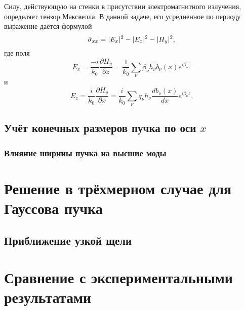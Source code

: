 Силу, действующую на стенки в присутствии электромагнитного излучения, определяет тензор Максвелла. В данной задаче, его усредненное по
периоду выражение даётся формулой
\begin{equation}
\bar{\sigma}_{xx} = \lvert E_x\rvert^2 - \lvert E_z\rvert^2 - \lvert H_y\rvert^2,
\end{equation}
где поля 
\begin{equation*}
E_x = \frac{-i}{k_0}\frac{\partial H_y}{\partial z} = \frac{1}{k_0}\sum_{\nu}\beta_\nu h_\nu b_\nu(x) e^{i \beta_\nu z}
\end{equation*}
и
\begin{equation*}
E_z = \frac{i}{k_0}\frac{\partial H_y}{\partial x} = \frac{i}{k_0}\sum_{\nu} q_\nu h_\nu  \frac{d b_\nu(x)}{d x} e^{i \beta_\nu z}.
\end{equation*}

\section{Учёт конечных размеров пучка по оси $x$}
\subsection{Влияние ширины пучка на высшие моды}

\chapter{Решение в трёхмерном случае для Гауссова пучка}
\section{Приближение узкой щели}

\chapter{Сравнение с экспериментальными результатами}

